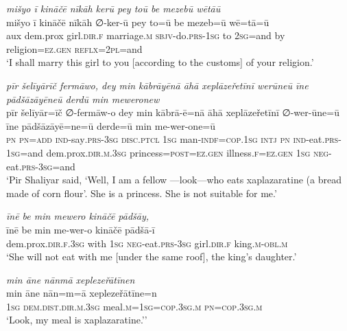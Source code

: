 \ea \label{ŽP.207}
\textit{mišyo ī kināčē nīkāh kerū pey toū be mezebū wētāū} \\ 
\gll mišyo ī kināčē nīkāh ∅-ker-ū pey to=ū be mezeb=ū wē=tā=ū \\ 
 aux dem.prox girl\textsc{.dir}\textsc{.f} marriage\textsc{.m} \textsc{sbjv-}do\textsc{.prs}\textsc{-\textsc{1sg}} to \textsc{2sg}=and by religion\textsc{\textsc{=ez.gen}} \textsc{reflx}=\textsc{2pl}=and \\ 
\glt `I shall marry this girl to you [according to the customs] of your religion.'
\z 
 
\ea \label{ŽP.210}
\textit{pīr šelīyārīč fermāwo, dey min kābrāyēnā āhā xeplāzeřetīnī werūneū īne pādšāzāyēneū derdū min meweronew} \\ 
\gll pīr šelīyār=īč ∅-fermāw-o dey min kābrā-ē=nā āhā xeplāzeřetīnī ∅-wer-ūne=ū īne pādšāzāyē=ne=ū derde=ū min me-wer-one=ū \\ 
 \textsc{pn} \textsc{pn}\textsc{=add} \textsc{ind-}say\textsc{.prs}\textsc{-3sg} \textsc{disc.ptcl} \textsc{1sg} man\textsc{-indf}\textsc{=cop}\textsc{.\textsc{1sg}} \textsc{intj} \textsc{pn} \textsc{ind-}eat\textsc{.prs}\textsc{-\textsc{1sg}}=and dem.prox\textsc{.dir}\textsc{.m}\textsc{.3sg} princess\textsc{=\textsc{post}}\textsc{\textsc{=ez.gen}} illness\textsc{.f}\textsc{\textsc{=ez.gen}} \textsc{1sg} \textsc{neg-}eat\textsc{.prs}\textsc{-3sg}=and \\ 
\glt `Pir Shaliyar said, ‘Well, I am a fellow —look—who eats xaplazaratine (a bread made of corn flour’. She is a princess. She is not suitable for me.'
\z 
 
\ea \label{ŽP.213}
\textit{īnē be min mewero kināčē pādšāy,} \\ 
\gll īnē be min me-wer-o kināčē pādšā-ī \\ 
 dem.prox\textsc{.dir}\textsc{.f}\textsc{.3sg} with \textsc{1sg} \textsc{neg-}eat\textsc{.prs}\textsc{-3sg} girl\textsc{.dir}\textsc{.f} king\textsc{.m}\textsc{-obl}\textsc{.m} \\ 
\glt `She will not eat with me [under the same roof], the king’s daughter.'
\z 
 
\ea \label{ŽP.214}
\textit{min āne nānmā xeplezeřātīnen} \\ 
\gll min āne nān=m=ā xeplezeřātīne=n \\ 
 \textsc{1sg} \textsc{dem.dist}\textsc{.dir}\textsc{.m}\textsc{.3sg} meal\textsc{.m}\textsc{=\textsc{1sg}}\textsc{=cop}\textsc{.3sg}\textsc{.m} \textsc{pn}\textsc{=cop}\textsc{.3sg}\textsc{.m} \\ 
\glt `Look, my meal is xaplazaratine.’'
\z 
 
